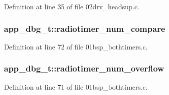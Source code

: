 Definition at line 35 of file 02drv\+\_\+headsup.\+c.

\subsubsection[{\texorpdfstring{radiotimer\+\_\+num\+\_\+compare}{radiotimer_num_compare}}]{ app\+\_\+dbg\+\_\+t\+::radiotimer\+\_\+num\+\_\+compare}\hypertarget{structapp__dbg__t_af2f788aaca6b99724a5d0847d3a9a503}{}\label{structapp__dbg__t_af2f788aaca6b99724a5d0847d3a9a503}


Definition at line 72 of file 01bsp\+\_\+bothtimers.\+c.

\subsubsection[{\texorpdfstring{radiotimer\+\_\+num\+\_\+overflow}{radiotimer_num_overflow}}]{ app\+\_\+dbg\+\_\+t\+::radiotimer\+\_\+num\+\_\+overflow}\hypertarget{structapp__dbg__t_a96a5c82d676849aa222b1fc1915b0c83}{}\label{structapp__dbg__t_a96a5c82d676849aa222b1fc1915b0c83}


Definition at line 71 of file 01bsp\+\_\+bothtimers.\+c.




